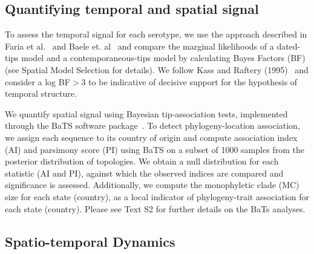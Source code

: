 \documentclass[10pt]{article}
\begin{document}
\subsection*{Quantifying temporal and spatial signal} 

To assess the temporal signal for each serotype, we use the approach described in Faria et al.~\citep{Faria2012} and Baele et. al~\citep{Baele2012} and compare the marginal likelihoods of a dated-tips model and a contemporaneous-tips model by calculating Bayes Factors (BF)~\citep{Suchard2001, Suchard2005} (see Spatial Model Selection for details).
We follow Kass and Raftery (1995)~\citep{KassRaftery1995} and consider a log BF$>$3 to be indicative of decisive support for the hypothesis of temporal structure.

We quantify spatial signal using Bayesian tip-association tests, implemented through the BaTS software package~\citep{Parker2008}.
To detect phylogeny-location association, we assign each sequence to its country of origin and compute association index (AI) and parsimony score (PI) using BaTS on a subset of 1000 samples from the posterior distribution of topologies.
We obtain a null distribution for each statistic (AI and PI), against which the observed indices are compared and significance is assessed.
Additionally, we compute the monophyletic clade (MC) size for each state (country), as a local indicator of phylogeny-trait association for each state (country).
Please see Text S2 for further details on the BaTs analyses.

\subsection*{Spatio-temporal Dynamics}
\end{document}
